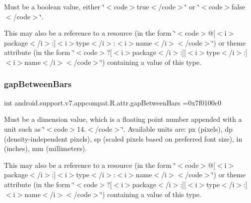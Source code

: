 Must be a boolean value, either \char`\"{}$<$code$>$true$<$/code$>$\char`\"{} or \char`\"{}$<$code$>$false$<$/code$>$\char`\"{}. 

This may also be a reference to a resource (in the form \char`\"{}$<$code$>$@\mbox{[}$<$i$>$package$<$/i$>$\+:\mbox{]}$<$i$>$type$<$/i$>$\+:$<$i$>$name$<$/i$>$$<$/code$>$\char`\"{}) or theme attribute (in the form \char`\"{}$<$code$>$?\mbox{[}$<$i$>$package$<$/i$>$\+:\mbox{]}\mbox{[}$<$i$>$type$<$/i$>$\+:\mbox{]}$<$i$>$name$<$/i$>$$<$/code$>$\char`\"{}) containing a value of this type. \mbox{\label{classandroid_1_1support_1_1v7_1_1appcompat_1_1R_1_1attr_a0ad90ce19f7d1a362e8a173250778b3b}} 
\subsubsection{\texorpdfstring{gap\+Between\+Bars}{gapBetweenBars}}
{\footnotesize\ttfamily int android.\+support.\+v7.\+appcompat.\+R.\+attr.\+gap\+Between\+Bars =0x7f0100c0\hspace{0.3cm}{\ttfamily [static]}}

Must be a dimension value, which is a floating point number appended with a unit such as \char`\"{}$<$code$>$14.\+5sp$<$/code$>$\char`\"{}. Available units are\+: px (pixels), dp (density-\/independent pixels), sp (scaled pixels based on preferred font size), in (inches), mm (millimeters). 

This may also be a reference to a resource (in the form \char`\"{}$<$code$>$@\mbox{[}$<$i$>$package$<$/i$>$\+:\mbox{]}$<$i$>$type$<$/i$>$\+:$<$i$>$name$<$/i$>$$<$/code$>$\char`\"{}) or theme attribute (in the form \char`\"{}$<$code$>$?\mbox{[}$<$i$>$package$<$/i$>$\+:\mbox{]}\mbox{[}$<$i$>$type$<$/i$>$\+:\mbox{]}$<$i$>$name$<$/i$>$$<$/code$>$\char`\"{}) containing a value of this type. \mbox{\label{classandroid_1_1support_1_1v7_1_1appcompat_1_1R_1_1attr_affe769b69f398d52a3cf3637c9303c60}} 
